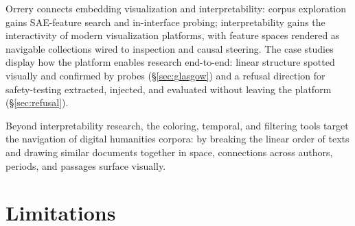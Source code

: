 \documentclass[11pt]{article}
\begin{document}
Orrery connects embedding visualization and interpretability: corpus exploration gains SAE-feature search and in-interface probing; interpretability gains the interactivity of modern visualization platforms, with feature spaces rendered as navigable
collections wired to inspection and causal steering. The case studies display how the platform enables research end-to-end: linear structure spotted visually and confirmed by probes (\S\ref{sec:glasgow}) and a refusal direction for safety-testing extracted, injected, and evaluated without leaving the platform (\S\ref{sec:refusal}).

Beyond interpretability research, the coloring, temporal, and filtering tools target the navigation of digital humanities corpora: by breaking the linear order of texts and drawing similar documents together in space, connections across authors, periods, and passages surface visually. %








\section*{Limitations}
\end{document}

